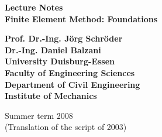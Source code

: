 \begin{titlepage}
\begin{center}
\vspace*{1cm}
{\bf \Large Lecture Notes \\ \vspace{1cm} 
\LARGE Finite Element Method: Foundations }

\vspace{3cm}

{\bf 
Prof. Dr.-Ing. J\"org Schr\"oder \\
Dr.-Ing. Daniel Balzani \\ 
University Duisburg-Essen \\
Faculty of Engineering Sciences \\
Department of Civil Engineering \\
Institute of Mechanics \\
}

\vspace{2cm}

\begin{figure}[h]
\begin{center}
\end{center}
\end{figure}

\vspace{6cm}

Summer term 2008 \\
(Translation of the script of 2003)

\end{center}
\end{titlepage}

